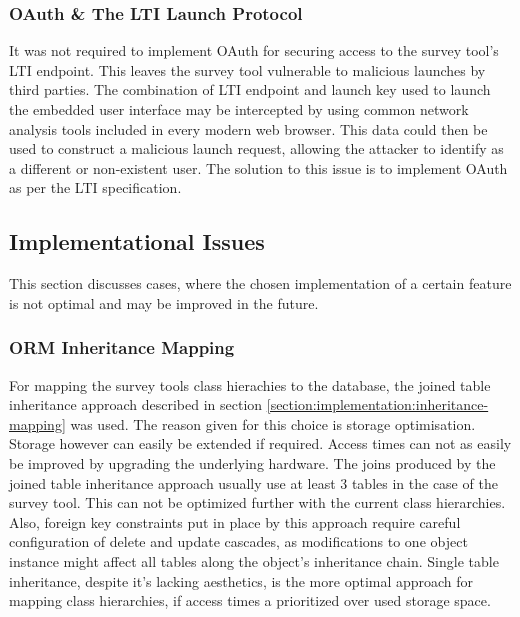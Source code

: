 		\subsubsection{OAuth \& The LTI Launch Protocol}
			It was not required to implement OAuth for securing
			access to the survey tool's LTI endpoint.
			This leaves the survey tool vulnerable to malicious
			launches by third parties. The combination of
			LTI endpoint and launch key used to launch the embedded
			user interface may be intercepted by using common
			network analysis tools included in every modern
			web browser. This data could then be used to construct
			a malicious launch request, allowing the attacker
			to identify as a different or non-existent user.
			The solution to this issue is to implement OAuth
			as per the LTI specification.


    \subsection{Implementational Issues}
    	This section discusses cases, where the chosen implementation
    	of a certain feature is not optimal and may be improved in the
    	future.

    	\subsubsection{ORM Inheritance Mapping}
    		For mapping the survey tools class hierachies to the database,
    		the joined table inheritance approach described in section
    		\ref{section:implementation:inheritance-mapping} was used.
    		The reason given for this choice is storage optimisation.
    		Storage however can easily be extended if required.
    		Access times can not as easily be improved by upgrading the
    		underlying hardware. The joins produced by the joined table
    		inheritance approach usually use at least 3 tables in the
    		case of the survey tool. This can not be optimized further
    		with the current class hierarchies. Also, foreign key
    		constraints put in place by this approach require
    		careful configuration of delete and update cascades,
    		as modifications to one object instance might affect
    		all tables along the object's inheritance chain.
    		Single table inheritance, despite it's lacking aesthetics,
    		is the more optimal approach for mapping class hierarchies,
    		if access times a prioritized over used storage space.

